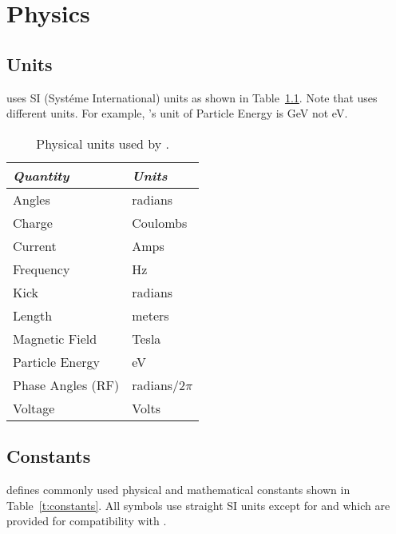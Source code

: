 \chapter{Physics}

\section{Units}
\label{s:units}

\bmad uses SI (Syst\'eme International) units as shown in
Table~\ref{t:units}.  Note that \mad uses different units. For example,
\mad's unit of Particle Energy is GeV not eV.
\begin{table}[ht]
\centering
\begin{tabular}{|l|l|} \hline
  {\em Quantity}     & {\em Units}       \\ \hline
  Angles             &    radians        \\ 
  Charge             &    Coulombs       \\
  Current            &    Amps           \\ 
  Frequency          &    Hz             \\ 
  Kick               &    radians        \\ 
  Length             &    meters         \\ 
  Magnetic Field     &    Tesla          \\ 
  Particle Energy    &    eV             \\ 
  Phase Angles (RF)  &    radians/2$\pi$ \\ 
  Voltage            &    Volts          \\ \hline
\end{tabular}
\caption{Physical units used by \bmad.}
\label{t:units}
\end{table}


\section{Constants}
\label{s:constants}

\bmad defines commonly used physical and mathematical constants
shown in Table~\ref{t:constants}.  All symbols use straight SI units
except for  and  which are provided for
compatibility with \mad.

